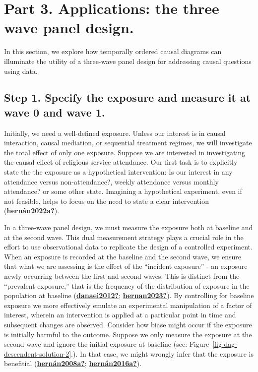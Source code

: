 \documentclass[
  singlecolumn]{report}
\begin{document}
\hypertarget{part-3.-applications-the-three-wave-panel-design.}{%
\section{Part 3. Applications: the three wave panel
design.}\label{part-3.-applications-the-three-wave-panel-design.}}

In this section, we explore how temporally ordered causal diagrams can
illuminate the utility of a three-wave panel design for addressing
causal questions using data.

\hypertarget{step-1.-specify-the-exposure-and-measure-it-at-wave-0-and-wave-1.}{%
\subsection{Step 1. Specify the exposure and measure it at wave 0 and
wave
1.}\label{step-1.-specify-the-exposure-and-measure-it-at-wave-0-and-wave-1.}}

Initially, we need a well-defined exposure. Unless our interest is in
causal interaction, causal mediation, or sequential treatment regimes,
we will investigate the total effect of only one exposure. Suppose we
are interested in investigating the causal effect of religious service
attendance. Our first task is to explicitly state the the exposure as a
hypothetical intervention: Is our interest in any attendance versus
non-attendance?, weekly attendance versus monthly attendance? or some
other state. Imagining a hypothetical experiment, even if not feasible,
helps to focus on the need to state a clear intervention
(\protect\hyperlink{ref-hernuxe1n2022a}{\textbf{hernán2022a?}}).

In a three-wave panel design, we must measure the exposure both at
baseline and at the second wave. This dual measurement strategy plays a
crucial role in the effort to use observational data to replicate the
design of a controlled experiment. When an exposure is recorded at the
baseline and the second wave, we ensure that what we are assessing is
the effect of the ``incident exposure'' - an exposure newly occurring
between the first and second waves. This is distinct from the
``prevalent exposure,'' that is the frequency of the distribution of
exposure in the population at baseline
(\protect\hyperlink{ref-danaei2012}{\textbf{danaei2012?}};
\protect\hyperlink{ref-hernan2023}{\textbf{hernan2023?}}). By
controlling for baseline exposure we more effectively emulate an
experimental manipulation of a factor of interest, wherein an
intervention is applied at a particular point in time and subsequent
changes are observed. Consider how biase might occur if the exposure is
initially harmful to the outcome. Suppose we only measure the exposure
at the second wave and ignore the initial exposure at baseline (see:
Figure~\ref{fig-dag-descendent-solution-2}.). In that case, we might
wrongly infer that the exposure is benefitial
(\protect\hyperlink{ref-hernuxe1n2008a}{\textbf{hernán2008a?}};
\protect\hyperlink{ref-hernuxe1n2016a}{\textbf{hernán2016a?}}).
\end{document}
